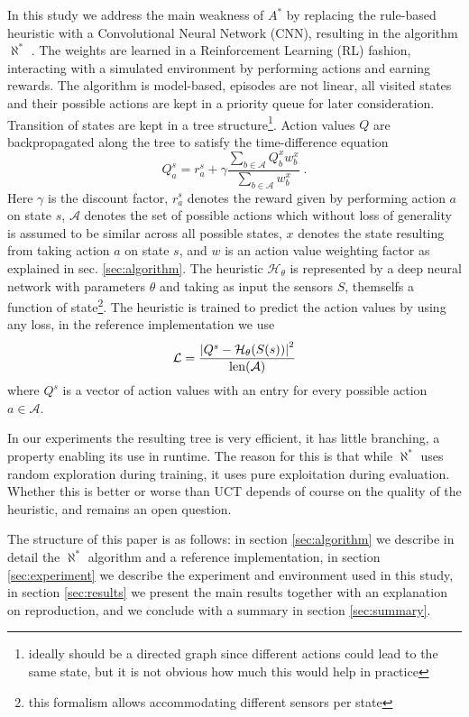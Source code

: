 \documentclass{article}
\newcommand{\alephstar}{$\aleph^*$ }
\newcommand{\astar}{$A^*$ }
\begin{document}
In this study we address the main weakness of \astar by replacing the rule-based heuristic with a Convolutional Neural Network (CNN), resulting in the algorithm \alephstar. The weights are learned in a Reinforcement Learning (RL) fashion, interacting with a simulated environment by performing actions and earning rewards. The algorithm is model-based, episodes are not linear, all visited states and their possible actions are kept in a priority queue for later consideration. Transition of states are kept in a tree structure\footnote{ideally should be a directed graph since different actions could lead to the same state, but it is not obvious how much this would help in practice}. Action values $Q$ are backpropagated along the tree to satisfy the time-difference equation
\begin{equation}
  \label{eq:backprop}  
  Q^s_a = r^s_a + \gamma \frac{
    \sum_{b\in{\mathcal A}} {Q^x_b w^x_b}
  }{
    \sum_{b\in{\mathcal A}} {w^x_b}
  }\;.
\end{equation}
Here $\gamma$ is the discount factor, $r^s_a$ denotes the reward given by performing action $a$ on state $s$, ${\mathcal A}$ denotes the set of possible actions which without loss of generality is assumed to be similar across all possible states, $x$ denotes the state resulting from taking action $a$ on state $s$, and $w$ is an action value weighting factor as explained in sec. \ref{sec:algorithm}. The heuristic ${\mathcal H}_\theta$ is represented by a deep neural network with parameters $\theta$ and taking as input the sensors $S$, themselfs a function of state\footnote{this formalism allows accommodating different sensors per state}. The heuristic is trained to predict the action values by using any loss, in the reference implementation we use 
\begin{equation}
  \mathcal{L} = \frac{\left| Q^s - {\mathcal H}_\theta(S(s)) \right|^2}{{\rm len}({\mathcal A})}
\end{equation}
where $Q^s$ is a vector of action values with an entry for every possible action $a \in \mathcal{A}$.

In our experiments the resulting tree is very efficient, it has little branching, a property enabling its use in runtime. The reason for this is that while \alephstar uses random exploration during training, it uses pure exploitation during evaluation. Whether this is better or worse than UCT depends of course on the quality of the heuristic, and remains an open question.

The structure of this paper is as follows: in section \ref{sec:algorithm} we describe in detail the \alephstar algorithm and a reference implementation, in section \ref{sec:experiment} we describe the experiment and environment used in this study, in section \ref{sec:results} we present the main results together with an explanation on reproduction, and we conclude with a summary in section \ref{sec:summary}. 
\end{document}
